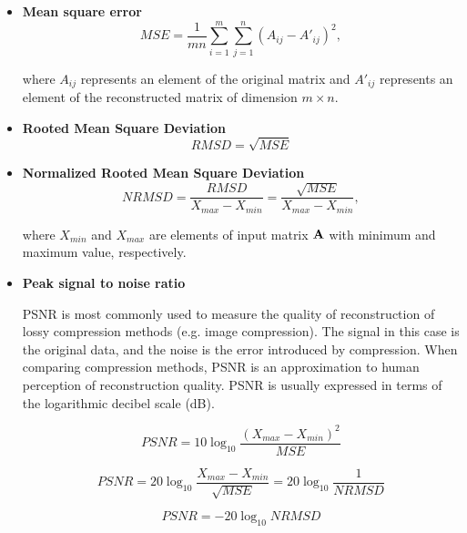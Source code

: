 \begin{itemize}
\item \textbf{Mean square error}
\begin{equation}
MSE=\frac{1}{m n} \sum_{i=1}^{m} \sum_{j=1}^{n} (A_{ij} - A'_{ij})^{2},
\label{eq:mse-def}
\end{equation}

where $A_{ij}$ represents an element of the original matrix and $A'_{ij}$ represents an element of the
reconstructed matrix of dimension $m \times n$.

\item \textbf{Rooted Mean Square Deviation}
\begin{equation}
RMSD=\sqrt{MSE}
\label{eq:rmsd-def}
\end{equation}

\item \textbf{Normalized Rooted Mean Square Deviation}
\begin{equation}
NRMSD=\frac{RMSD}{X_{max}-X_{min}}=\frac{\sqrt{MSE}}{X_{max}-X_{min}},
\label{eq:nrmsd-def}
\end{equation}

where $X_{min}$ and $X_{max}$ are elements of input matrix $\mathbf{A}$ with minimum and maximum value, respectively.

\item \textbf{Peak signal to noise ratio}

PSNR is most commonly used to measure the quality of reconstruction of lossy compression methods (e.g. image compression). The signal in this case is the original data, and the noise is the error introduced by compression. When comparing compression methods, PSNR is an approximation to human perception of reconstruction quality. PSNR is usually expressed in terms of the logarithmic decibel scale (dB).

\begin{equation}
PSNR=10\log_{10}\frac{(X_{max}-X_{min})^{2}}{MSE}
\end{equation}

\begin{equation}
PSNR=20\log_{10}\frac{X_{max}-X_{min}}{\sqrt{MSE}}=20\log_{10}\frac{1}{NRMSD}
\end{equation}

\begin{equation}
PSNR=-20\log_{10}NRMSD
\label{eq:psnr-def}
\end{equation}

\end{itemize}

